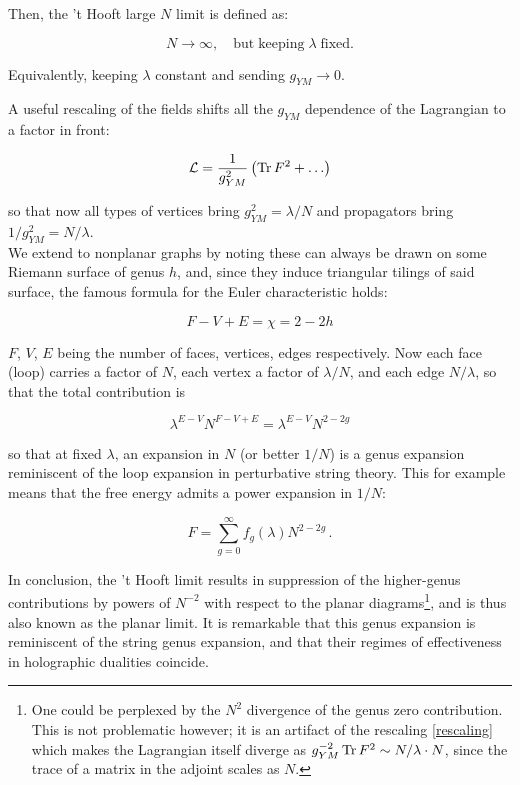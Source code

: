 Then, the 't Hooft large $N$ limit is defined as:

\begin{equation}
N \rightarrow \infty, \quad \mathrm{but \; keeping } \; \lambda \; \mathrm{fixed.}
\end{equation}

Equivalently, keeping $\lambda$ constant and sending $g_{YM} \rightarrow 0$.

A useful rescaling of the fields shifts all the $g_{YM}$ dependence of the Lagrangian to a factor in front:

\begin{equation} \label{rescaling} \mathcal{L} = \frac{1}{g_{YM}^2} \left( \operatorname{Tr} F^2 + \ldots \right) \end{equation}

so that now all types of vertices bring $g_{YM}^2 = \lambda/N$ and propagators bring $1/g_{YM}^2 = N/\lambda$.\\

We extend to nonplanar graphs by noting these can always be drawn on some Riemann surface of genus $h$, and, since they induce triangular tilings of said surface, the famous formula for the Euler characteristic holds:

\begin{equation}
F - V + E = \chi = 2 - 2h 
\end{equation}

$F$, $V$, $E$ being the number of faces, vertices, edges respectively. Now each face (loop) carries a factor of $N$, each vertex a factor of $\lambda/N$, and each edge $N/\lambda$, so that the total contribution is

\begin{equation}
\lambda^{E-V} N^{F-V+E} = \lambda^{E-V} N^{2-2g} 
\end{equation}

so that at fixed $\lambda$, an expansion in $N$ (or better $1/N$) is a genus expansion reminiscent of the loop expansion in perturbative string theory. This for example means that the free energy admits a power expansion in $1/N$:

\begin{equation}
F = \sum_{g=0}^\infty f_g(\lambda) N^{2-2g}\,.
\end{equation}

In conclusion, the 't Hooft limit results in suppression of the higher-genus contributions by powers of $N^{-2}$ with respect to the planar diagrams\footnote{One could be perplexed by the $N^2$ divergence of the genus zero contribution. This is not problematic however; it is an artifact of the rescaling \ref{rescaling} which makes the Lagrangian itself diverge as $g_{YM}^{-2} \operatorname{Tr} F^2 \sim N/\lambda \cdot N$, since the trace of a matrix in the adjoint scales as $N$.}, and is thus also known as the planar limit. It is remarkable that this genus expansion is reminiscent of the string genus expansion, and that their regimes of effectiveness in holographic dualities coincide.

